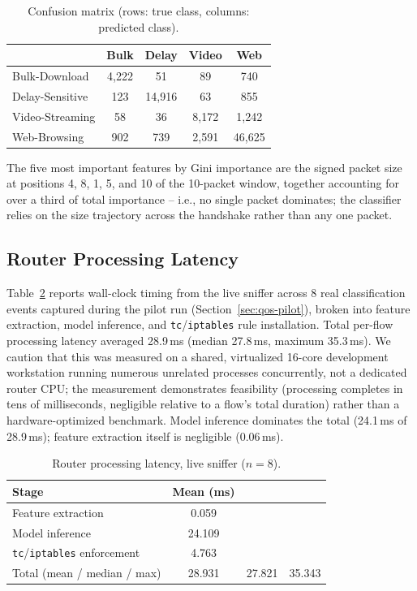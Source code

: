 \documentclass[10pt,twocolumn]{article}
\begin{document}
\begin{table}[t]
\centering
\caption{Confusion matrix (rows: true class, columns: predicted class).}
\label{tab:confusion}
\small
\begin{tabular}{lcccc}
\toprule
 & Bulk & Delay & Video & Web \\
\midrule
Bulk-Download   & 4{,}222 & 51 & 89 & 740 \\
Delay-Sensitive & 123 & 14{,}916 & 63 & 855 \\
Video-Streaming & 58 & 36 & 8{,}172 & 1{,}242 \\
Web-Browsing    & 902 & 739 & 2{,}591 & 46{,}625 \\
\bottomrule
\end{tabular}
\end{table}

The five most important features by Gini importance are the signed
packet size at positions 4, 8, 1, 5, and 10 of the 10-packet window,
together accounting for over a third of total importance -- i.e., no
single packet dominates; the classifier relies on the size trajectory
across the handshake rather than any one packet.

\subsection{Router Processing Latency}

Table~\ref{tab:latency} reports wall-clock timing from the live sniffer
across 8 real classification events captured during the pilot run
(Section~\ref{sec:qos-pilot}), broken into feature extraction, model
inference, and \texttt{tc}/\texttt{iptables} rule installation. Total
per-flow processing latency averaged 28.9\,ms (median 27.8\,ms, maximum
35.3\,ms). We caution that this was measured on a shared, virtualized
16-core development workstation running numerous unrelated processes
concurrently, not a dedicated router CPU; the measurement demonstrates
feasibility (processing completes in tens of milliseconds, negligible
relative to a flow's total duration) rather than a hardware-optimized
benchmark. Model inference dominates the total (24.1\,ms of 28.9\,ms);
feature extraction itself is negligible (0.06\,ms).

\begin{table}[t]
\centering
\caption{Router processing latency, live sniffer (\(n=8\)).}
\label{tab:latency}
\begin{tabular}{lccc}
\toprule
Stage & Mean (ms) & & \\
\midrule
Feature extraction & 0.059 & & \\
Model inference & 24.109 & & \\
\texttt{tc}/\texttt{iptables} enforcement & 4.763 & & \\
\midrule
Total (mean / median / max) & 28.931 & 27.821 & 35.343 \\
\bottomrule
\end{tabular}
\end{table}
\end{document}
